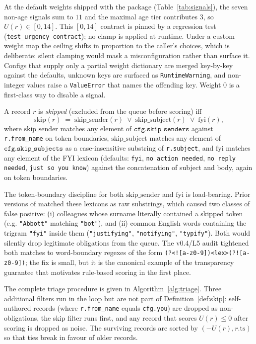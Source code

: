 At the default weights shipped with the package
(Table~\ref{tab:signals}), the seven non-age signals sum to $11$ and the
maximal age tier contributes $3$, so $U(r) \in [0, 14]$.  This
$[0,14]$ contract is pinned by a regression test
(\texttt{test\_urgency\_contract}); no clamp is applied at runtime.
Under a custom weight map the ceiling shifts in proportion to the
caller's choices, which is deliberate: silent clamping would mask a
misconfiguration rather than surface it. Configs that supply only a
partial weight dictionary are merged key-by-key against the defaults,
unknown keys are surfaced as \texttt{RuntimeWarning}, and non-integer
values raise a \texttt{ValueError} that names the offending key. Weight
$0$ is a first-class way to disable a signal.

\begin{definition}
\label{def:skip}
A record $r$ is \emph{skipped} (excluded from the queue before scoring)
iff
\[
\mathrm{skip}(r) \;=\; \mathrm{skip\_sender}(r) \;\lor\; \mathrm{skip\_subject}(r) \;\lor\; \mathrm{fyi}(r),
\]
where $\mathrm{skip\_sender}$ matches any element of
$\mathtt{cfg.skip\_senders}$ against \texttt{r.from\_name} on token
boundaries, $\mathrm{skip\_subject}$ matches any element of
$\mathtt{cfg.skip\_subjects}$ as a case-insensitive substring of
\texttt{r.subject}, and $\mathrm{fyi}$ matches any element of the FYI
lexicon (defaults: \texttt{fyi}, \texttt{no action needed},
\texttt{no reply needed}, \texttt{just so you know}) against the
concatenation of subject and body, again on token boundaries.
\end{definition}

The token-boundary discipline for both $\mathrm{skip\_sender}$ and
$\mathrm{fyi}$ is load-bearing. Prior versions of \coviber{} matched
these lexicons as raw substrings, which caused two classes of false
positive: (i) colleagues whose surname literally contained a skipped
token (e.g. \texttt{"Abbott"} matching \texttt{"bot"}), and (ii)
common English words containing the trigram \texttt{"fyi"} inside them
(\texttt{"justifying"}, \texttt{"notifying"}, \texttt{"typify"}). Both
would silently drop legitimate obligations from the queue. The v0.4/L5
audit tightened both matches to word-boundary regexes of the form
\verb|(?<![a-z0-9])<lex>(?![a-z0-9])|; the fix is small, but it is the
canonical example of the transparency guarantee that motivates
rule-based scoring in the first place.

The complete triage procedure is given in Algorithm~\ref{alg:triage}.
Three additional filters run in the loop but are not part of
Definition~\ref{def:skip}: self-authored records (where
\texttt{r.from\_name} equals \texttt{cfg.you}) are dropped as
non-obligations, the skip filter runs first, and any record that scores
$U(r) \le 0$ after scoring is dropped as noise. The surviving records
are sorted by $(-U(r), r.\mathrm{ts})$ so that ties break in favour of
older records.

